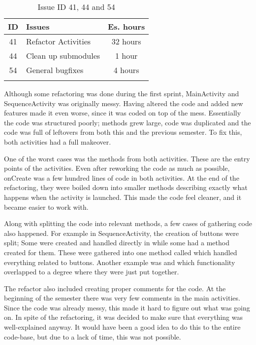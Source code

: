 \begin{longtable} { | c | p{12cm} | c | } 
\hline
	ID 	&	Issues	&		 Es. hours \\\hline
	41	&	Refactor Activities	&	32 hours	\\\hline
	44	&	Clean up submodules &	1 hour	\\\hline
	54	&	General bugfixes	&	4 hours \\\hline
\caption{Issue ID 41, 44 and 54}
\label{tab:spr4_refactoroverview}
\end{longtable}

Although some refactoring was done during the first sprint, MainActivity and SequenceActivity was originally messy. Having altered the code and added new features made it even worse, since it was coded on top of the mess. Essentially the code was structured poorly; methods grew large, code was duplicated and the code was full of leftovers from both this and the previous semester. To fix this, both activities had a full makeover.

One of the worst cases was the  methods from both activities. These are the entry points of the activities. Even after reworking the code as much as possible, onCreate was a few hundred lines of code in both activities. At the end of the refactoring, they were boiled down into smaller methods describing exactly what happens when the activity is launched. This made the code feel cleaner, and it became easier to work with. 

Along with splitting the code into relevant methods, a few cases of gathering code also happened. For example in SequenceActivity, the creation of buttons were split; Some were created and handled directly in  while some had a method created for them. These were gathered into one method called  which handled everything related to buttons. Another example was  and  which functionality overlapped to a degree where they were just put together.

The refactor also included creating proper comments for the code. At the beginning of the semester there was very few comments in the main activities. Since the code was already messy, this made it hard to figure out what was going on. In spite of the refactoring, it was decided to make sure that everything was well-explained anyway. It would have been a good idea to do this to the entire code-base, but due to a lack of time, this was not possible.

